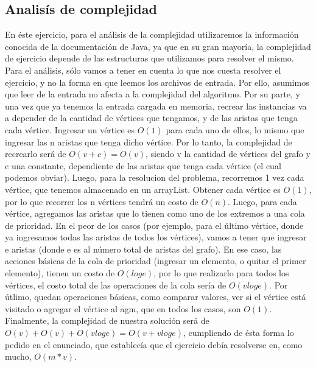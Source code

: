 \subsection{Analisís de complejidad}	
En éste ejercicio, para el análisis de la complejidad utilizaremos la información conocida de la documentación de Java, ya que en su gran mayoría, la complejidad de ejercicio depende de las estructuras que utilizamos para resolver el mismo.
Para el análisis, sólo vamos a tener en cuenta lo que nos cuesta resolver el ejercicio, y no la forma en que leemos los archivos de entrada. Por ello, asumimos que leer de la entrada no afecta a la complejidad del algoritmo. Por su parte, y una vez que ya tenemos la entrada cargada en memoria, recrear las instancias va a depender de la cantidad de vértices que tengamos, y de las aristas que tenga cada vértice. Ingresar un vértice es $O(1)$ para cada uno de ellos, lo mismo que ingresar las n aristas que tenga dicho vértice. Por lo tanto, la complejidad de recrearlo será de $O(v + c) = O(v)$, siendo v la cantidad de vértices del grafo y c una constante, dependiente de las aristas que tenga cada vértice (el cual podemos obviar).
Luego, para la resolucion del problema, recorremos 1 vez cada vértice, que tenemos almacenado en un arrayList. Obtener cada vértice es $O(1)$, por lo que recorrer los n vértices tendrá un costo de $O(n)$. 
Luego, para cada vértice, agregamos las aristas que lo tienen como uno de los extremos a una cola de prioridad. En el peor de los casos (por ejemplo, para el último vértice, donde ya ingresamos todas las aristas de todos los vértices), vamos a tener que ingresar e aristas (donde e es al número total de aristas del grafo). En ese caso, las acciones básicas de la cola de prioridad (ingresar un elemento, o quitar el primer elemento), tienen un costo de $O(log e)$, por lo que realizarlo para todos los vértices, el costo total de las operaciones de la cola sería de $O(v log e)$.
Por útlimo, quedan operaciones básicas, como comparar valores, ver si el vértice está visitado o agregar el vértice al agm, que en todos los casos, son $O(1)$.
Finalmente, la complejidad de nuestra solución será de $O(v) + O(v) + O(v log e) = O(v + v log e)$, cumpliendo de ésta forma lo pedido en el enunciado, que establecía que el ejercicio debía resolverse en, como mucho, $O(m*v)$.

